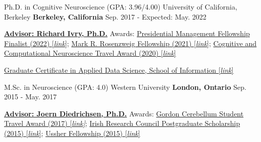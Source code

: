 

\begin{cventries}

  \cventry
    {Ph.D. in Cognitive Neuroscience (GPA: 3.96/4.00)} %
    {University of California, Berkeley} %
    {\textbf{Berkeley, California}} %
    {Sep. 2017 - Expected: May. 2022} %
    {
      \begin{cvitems} %
        \item {{\href{http://ivrylab.berkeley.edu/rich-ivry.html}{\textbf{Advisor: Richard Ivry, Ph.D.}}} Awards: \href{https://apply.pmf.gov/finalists.aspx}{Presidential Management Fellowship Finalist (2022) [\textit{link}]}; \href{https://psychology.berkeley.edu/give/endowed-funds}{Mark R. Rosenzweig Fellowship (2021) [\textit{link}]}; \href{https://2021.ccneuro.org/index.php}{Cognitive and Computational Neuroscience Travel Award (2020) [\textit{link}]}}
        \item {{\href{https://www.ischool.berkeley.edu/programs/data-science-certificate}{Graduate Certificate in Applied Data Science, School of Information [\textit{link}]}}}
      \end{cvitems}
    }
    
  \cventry
    {M.Sc. in Neuroscience (GPA: 4.0)} %
    {Western University} %
    {\textbf{London, Ontario}} %
    {Sep. 2015 - May. 2017} %
    {
      \begin{cvitems} %
        \item {{\href{http://www.diedrichsenlab.org/}{\textbf{Advisor: Joern Diedrichsen, Ph.D.}}} Awards: \href{https://www.grc.org/cerebellum-grs-conference/2017/}{Gordon Cerebellum Student Travel Award (2017) [\textit{link]}}; \href{https://www.gov.ie/en/service/third-level-scholarships/}{Irish Research Council Postgraduate Scholarship (2015) [\textit{link}]}; \href{https://www.tcd.ie/study/international/scholarships/Postgraduate/ussher.php}{Ussher Fellowship (2015) [\textit{link}]}}
      \end{cvitems}
    }
    

\end{cventries}
